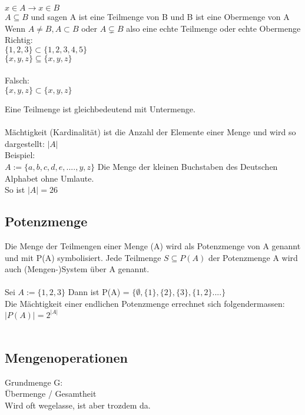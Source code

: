 \documentclass[../gruppenarbeit_1.tex]{subfiles}
\begin{document}
$x \in A \rightarrow x \in B$\\
$A \subseteq B$ und sagen A ist eine Teilmenge von B und B ist eine Obermenge von A\\

Wenn $A \ne B, A \subset B$ oder $A \subsetneq B$ also eine echte Teilmenge oder echte Obermenge\\

Richtig:\\
$\{1,2,3\} \subset \{1,2,3,4,5\}$\\
$\{x,y,z\} \subseteq \{x,y,z\}$\\
\\
Falsch: \\
$\{x,y,z\} \subset \{x,y,z\}$

Eine Teilmenge ist gleichbedeutend mit Untermenge.\\
\\

Mächtigkeit (Kardinalität) ist die Anzahl der Elemente einer Menge und wird so dargestellt: $|A|$\\

Beispiel:\\
$A := \{a,b,c,d,e,....,y,z\}$ Die Menge der kleinen Buchstaben des Deutschen Alphabet ohne Umlaute.\\
So ist $|A| = 26$\\

\subsection{Potenzmenge}
Die Menge der Teilmengen einer Menge (A) wird als Potenzmenge von A genannt und mit P(A) symbolisiert.
Jede Teilmenge $S \subseteq P(A)$ der Potenzmenge A wird auch (Mengen-)System über A genannt.\\
\\
Sei $A := \{1,2,3\}$ Dann ist P(A) = $\{\emptyset, \{1\},\{2\},\{3\},\{1,2\}....\}$\\
Die Mächtigkeit einer endlichen Potenzmenge errechnet sich folgendermassen:\\
$|P(A)| = 2^{|A|}$\\
\\

\subsection{Mengenoperationen}
Grundmenge G:\\
Übermenge / Gesamtheit\\
Wird oft wegelasse, ist aber trozdem da.
\\
\end{document}

